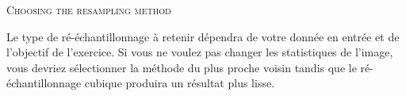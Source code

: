 \begin{Tip}\caption{\textsc{Choosing the resampling method}}
Le type de ré-échantillonnage à retenir dépendra de votre donnée en entrée et de l'objectif de l'exercice. Si vous ne voulez pas changer les statistiques de l'image, vous devriez sélectionner la méthode du plus proche voisin tandis que le ré-échantillonnage cubique produira un résultat plus lisse.
\end{Tip}
